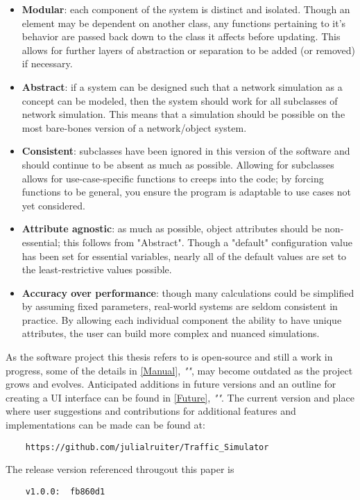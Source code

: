 \begin{itemize}
  \item \textbf{Modular}:  each component of the system is distinct and isolated.  Though an element may be dependent on another class, any functions pertaining to it's behavior are passed back down to the class it affects before updating.  This allows for further layers of abstraction or separation to be added (or removed) if necessary.
  \item \textbf{Abstract}:  if a system can be designed such that a network simulation as a concept can be modeled, then the system should work for all subclasses of network simulation.  This means that a simulation should be possible on the most bare-bones version of a network/object system.
  \item  \textbf{Consistent}:  subclasses have been ignored in this version of the software and should continue to be absent as much as possible.  Allowing for subclasses allows for use-case-specific functions to creeps into the code; by forcing functions to be general, you ensure the program is adaptable to use cases not yet considered.
  \item \textbf{Attribute agnostic}:  as much as possible, object attributes should be non-essential; this follows from "Abstract".  Though a "default" configuration value has been set for essential variables, nearly all of the default values are set to the least-restrictive values possible.
  \item \textbf{Accuracy over performance}:  though many calculations could be simplified by assuming fixed parameters, real-world systems are seldom consistent in practice.  By allowing each individual component the ability to have unique attributes, the user can build more complex and nuanced simulations.
\end{itemize}


\par As the software project this thesis refers to is open-source and still a work in progress, some of the details in \autoref{Manual}, \textit{""}, may become outdated as the project grows and evolves.  Anticipated additions in future versions and an outline for creating a UI interface can be found in \autoref{Future}, \textit{""}.  The current version and place where user suggestions and contributions for additional features and implementations can be made can be found at:  
\begin{verbatim}
    https://github.com/julialruiter/Traffic_Simulator
\end{verbatim}

\noindent The release version referenced througout this paper is 
\begin{verbatim}
    v1.0.0:  fb860d1
\end{verbatim}


